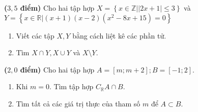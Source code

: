 \begin{bt}%
	\textbf{($3,5$ điểm)} Cho hai tập hợp $X = \left\{x \in \mathbb{Z}\big| \left|2x + 1\right| \le 3\right\}$ và\\
	$Y = \left\{x \in \mathbb{R}\big|\left(x + 1\right)\left(x - 2\right)\left(x^2 - 8x + 15\right) = 0\right\}$ 
	\begin{enumerate}
		\item Viết các tập $X,Y$ bằng cách liệt kê các phần tử.
		\item Tìm $X \cap Y, X\cup Y$ và $ X\setminus Y$.
	\end{enumerate}
\end{bt}
\begin{bt}%
	\textbf{($2,0$ điểm)} Cho hai tập hợp $A = \left[ m; m + 2\right]; B =\left[ -1; 2\right]$. 
	\begin{enumerate}
		\item Khi $m=0$. Tìm tập hợp $C_\mathbb{R}A \cap B$.
		\item Tìm tất cả các giá trị thực của tham số $m$ để $A \subset B$.
	\end{enumerate} 
	\loigiai{
		\begin{enumerate}
			\item Với $m=0$ thì $A=[0;2]\Rightarrow C_\mathbb{R}A =(- \infty;0)\cup (2;+\infty)$.\\
			Khi đó $C_\mathbb{R}A \cap B =[-1;0)$. 
			\item Để $A \subset B$ thì $\heva{& m \geq -1\\& m + 2 \leq 2}$ \\ 
			$\Leftrightarrow \heva{& m \geq -1 \\ & m \leq 0} \Leftrightarrow -1\le m \le 0$
		\end{enumerate} 
	}
\end{bt} 

